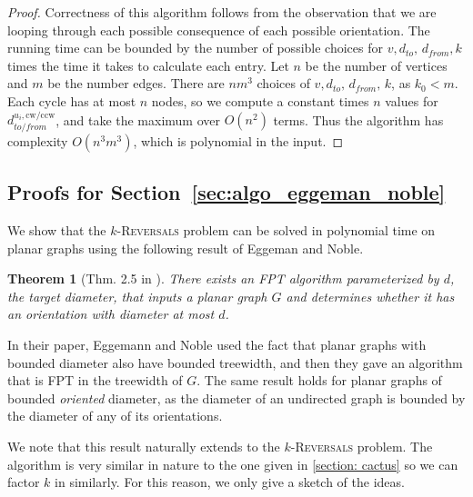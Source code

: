\documentclass[11pt, twoside]{article}
\numberwithin{equation}{section}
\numberwithin{table}{section}
\numberwithin{figure}{section}
\newtheorem{theorem}{Theorem}[section]
\theoremstyle{definition}
\theoremstyle{definition}
\theoremstyle{definition}
\begin{document}
\begin{appendices}
\begin{proof}
    
	Correctness of this algorithm follows from the observation that we are looping through each possible consequence of each possible orientation. The running time can be bounded by the number of possible choices for $v, d_{to}, \, d_{from}, k$ times the time it takes to calculate each entry. 
    Let $n$ be the number of vertices and $m$ be the number edges.
    There are $ nm^3 $ choices of $ v, d_{to}, \, d_{from}, \, k $, as $k_0<m$. Each cycle has at most $n$ nodes,
    so we compute a constant times $n$ values for $ d_{to/from}^{u_i,\text{cw}/\text{ccw}} $, and take the maximum over $O(n^2)$ terms. Thus the algorithm has complexity $O(n^3m^3)$, which is polynomial in the input. 
	

\end{proof}


\subsection{Proofs for Section~\ref{sec:algo_eggeman_noble}}
\label{section_deferred_FPT_k_fixed}

We show that the \textsc{$k$-Reversals} problem can be solved in polynomial time on planar graphs using the following result of Eggeman and Noble.

\begin{theorem}[Thm. 2.5 in \cite{eggemann2009minimizing}]\label{thm:fpt_on_diameter}
    There exists an FPT algorithm parameterized by $d$, the target diameter, that inputs a planar graph $G$ and determines whether it has an orientation with diameter at most $d$.
\end{theorem} 

In their paper, Eggemann and Noble used the fact that planar graphs with bounded diameter also have bounded treewidth, and then they gave an algorithm that is FPT in the treewidth of $G$. The same result holds for planar graphs of bounded \emph{oriented} diameter, as the diameter of an undirected graph is bounded by the diameter of any of its orientations. 

We note that this result naturally extends to the \textsc{$k$-Reversals} problem. The algorithm is very similar in nature to the one given in \cref{section: cactus} so we can factor $k$ in similarly. 
 For this reason, we only give a sketch of the ideas.


\end{appendices}
\end{document}

